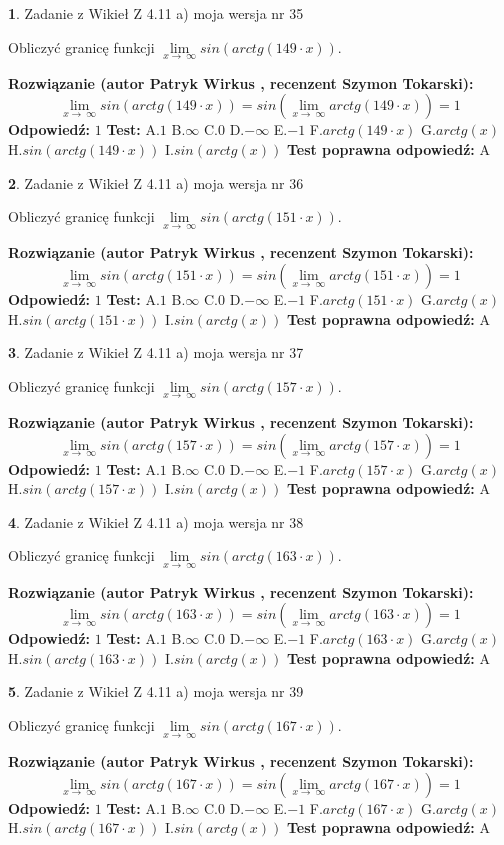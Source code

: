\documentclass[12pt, a4paper]{article}
\theoremstyle{definition} %
\newtheorem{zad}{}
\newcommand{\zadStart}[1]{\begin{zad}#1\newline}
\newcommand{\zadStop}{\end{zad}}
\newcommand{\rozwStart}[2]{\noindent \textbf{Rozwiązanie (autor #1 , recenzent #2): }\newline}
\newcommand{\rozwStop}{\newline}
\newcommand{\odpStart}{\noindent \textbf{Odpowiedź:}\newline}
\newcommand{\odpStop}{\newline}
\newcommand{\testStart}{\noindent \textbf{Test:}\newline}
\newcommand{\testStop}{\newline}
\newcommand{\kluczStart}{\noindent \textbf{Test poprawna odpowiedź:}\newline}
\newcommand{\kluczStop}{\newline}
\begin{document}
\zadStart{Zadanie z Wikieł Z 4.11 a) moja wersja nr 35}

Obliczyć granicę funkcji  $\lim\limits_{x\to\ \infty}sin(arctg(149\cdot x))$.
\zadStop
\rozwStart{Patryk Wirkus}{Szymon Tokarski}
$$\lim\limits_{x\to\ \infty}sin(arctg(149\cdot x)) = sin(\lim\limits_{x\to\ \infty}arctg(149\cdot x)) = 1$$
\rozwStop
\odpStart
$1$
\odpStop
\testStart
A.$1$ B.$\infty$ C.$0$ D.$-\infty$ E.$-1$
F.$arctg(149\cdot x)$ G.$arctg(x)$
H.$sin(arctg(149\cdot x))$
I.$sin(arctg(x))$
\testStop
\kluczStart
A
\kluczStop



\zadStart{Zadanie z Wikieł Z 4.11 a) moja wersja nr 36}

Obliczyć granicę funkcji  $\lim\limits_{x\to\ \infty}sin(arctg(151\cdot x))$.
\zadStop
\rozwStart{Patryk Wirkus}{Szymon Tokarski}
$$\lim\limits_{x\to\ \infty}sin(arctg(151\cdot x)) = sin(\lim\limits_{x\to\ \infty}arctg(151\cdot x)) = 1$$
\rozwStop
\odpStart
$1$
\odpStop
\testStart
A.$1$ B.$\infty$ C.$0$ D.$-\infty$ E.$-1$
F.$arctg(151\cdot x)$ G.$arctg(x)$
H.$sin(arctg(151\cdot x))$
I.$sin(arctg(x))$
\testStop
\kluczStart
A
\kluczStop



\zadStart{Zadanie z Wikieł Z 4.11 a) moja wersja nr 37}

Obliczyć granicę funkcji  $\lim\limits_{x\to\ \infty}sin(arctg(157\cdot x))$.
\zadStop
\rozwStart{Patryk Wirkus}{Szymon Tokarski}
$$\lim\limits_{x\to\ \infty}sin(arctg(157\cdot x)) = sin(\lim\limits_{x\to\ \infty}arctg(157\cdot x)) = 1$$
\rozwStop
\odpStart
$1$
\odpStop
\testStart
A.$1$ B.$\infty$ C.$0$ D.$-\infty$ E.$-1$
F.$arctg(157\cdot x)$ G.$arctg(x)$
H.$sin(arctg(157\cdot x))$
I.$sin(arctg(x))$
\testStop
\kluczStart
A
\kluczStop



\zadStart{Zadanie z Wikieł Z 4.11 a) moja wersja nr 38}

Obliczyć granicę funkcji  $\lim\limits_{x\to\ \infty}sin(arctg(163\cdot x))$.
\zadStop
\rozwStart{Patryk Wirkus}{Szymon Tokarski}
$$\lim\limits_{x\to\ \infty}sin(arctg(163\cdot x)) = sin(\lim\limits_{x\to\ \infty}arctg(163\cdot x)) = 1$$
\rozwStop
\odpStart
$1$
\odpStop
\testStart
A.$1$ B.$\infty$ C.$0$ D.$-\infty$ E.$-1$
F.$arctg(163\cdot x)$ G.$arctg(x)$
H.$sin(arctg(163\cdot x))$
I.$sin(arctg(x))$
\testStop
\kluczStart
A
\kluczStop



\zadStart{Zadanie z Wikieł Z 4.11 a) moja wersja nr 39}

Obliczyć granicę funkcji  $\lim\limits_{x\to\ \infty}sin(arctg(167\cdot x))$.
\zadStop
\rozwStart{Patryk Wirkus}{Szymon Tokarski}
$$\lim\limits_{x\to\ \infty}sin(arctg(167\cdot x)) = sin(\lim\limits_{x\to\ \infty}arctg(167\cdot x)) = 1$$
\rozwStop
\odpStart
$1$
\odpStop
\testStart
A.$1$ B.$\infty$ C.$0$ D.$-\infty$ E.$-1$
F.$arctg(167\cdot x)$ G.$arctg(x)$
H.$sin(arctg(167\cdot x))$
I.$sin(arctg(x))$
\testStop
\kluczStart
A
\kluczStop
\end{document}
